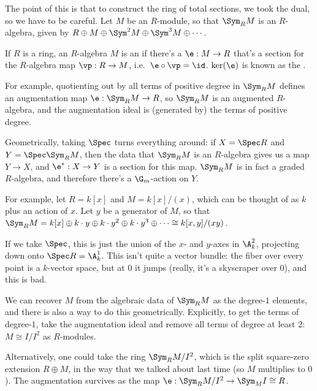 The point of this is that to construct the ring of total sections, we took the dual, so we have to be careful. Let
\(M\) be an \(R\)-module, so that \(\Sym_R M\) is an \(R\)-algebra, given by \(R\oplus M\oplus\Sym^2 M\oplus\Sym^3
M\oplus\dotsb\).
\begin{defn}
If \(R\) is a ring, an \(R\)-algebra \(M\) is an  if there's a  \(\e:M\to R\) that's a section for the \(R\)-algebra map \(\vp:R\to M\), i.e.\ \(\e\circ\vp = \id\).
\(\ker(\e)\) is known as the .
\end{defn}
For example, quotienting out by all terms of positive degree in \(\Sym_R M\) defines an augmentation map
\(\e:\Sym_R M\to R\), so \(\Sym_R M\) is an augmented \(R\)-algebra, and the augmentation ideal is (generated by)
the terms of positive degree.

Geometrically, taking \(\Spec\) turns everything around: if \(X = \Spec R\) and \(Y = \Spec\Sym_R M\), then the
data that \(\Sym_R M\) is an \(R\)-algebra gives us a map \(Y\to X\), and \(\e^*:X\to Y\) is a section for this
map. \(\Sym_R M\) is in fact a graded \(R\)-algebra, and therefore there's a \(\G_m\)-action on \(Y\).

For example, let \(R = k[x]\) and \(M = k[x]/(x)\), which can be thought of as \(k\) plus an action of \(x\). Let
\(y\) be a generator of \(M\), so that \(\Sym_R M = k[x]\oplus k\cdot y\oplus k\cdot y^2\oplus k\cdot
y^3\oplus\dotsb\cong k[x,y]/(xy)\).

If we take \(\Spec\), this is just the union of the \(x\)- and \(y\)-axes in \(\A_k^2\), projecting down onto
\(\Spec R = \A_k^1\). This isn't quite a vector bundle: the fiber over every point is a \(k\)-vector space, but at
\(0\) it jumps (really, it's a skyscraper over \(0\)), and this is bad.

We can recover \(M\) from the algebraic data of \(\Sym_R M\) as the degree-\(1\) elements, and there is also a way
to do this geometrically. Explicitly, to get the terms of degree-\(1\), take the augmentation ideal and remove all
terms of degree at least \(2\): \(M\cong I/I^2\) as \(R\)-modules.

Alternatively, one could take the ring \(\Sym_R M/I^2\), which is the split square-zero extension \(R\oplus M\), in
the way that we talked about last time (so \(M\) multiplies to \(0\)). The augmentation survives as the map
\(\e:\Sym_R M/I^2\to\Sym_M I \cong R\).

